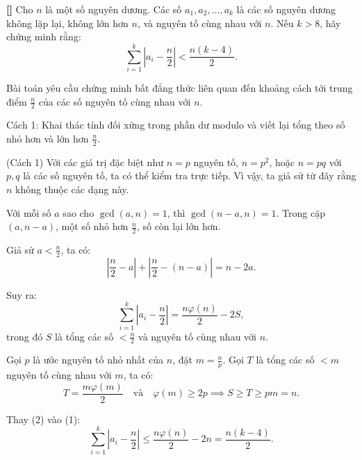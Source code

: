 \documentclass[../01-divisibility.tex]{subfiles}
\begin{document}
\begin{example*}\label{example:KOR-2015-MO-P8}\textbf{[]}
	Cho \( n \) là một số nguyên dương. Các số \( a_1, a_2, \dots, a_k \) là các số nguyên dương không lặp lại, không lớn hơn \( n \),
	và nguyên tố cùng nhau với \( n \). Nếu \( k > 8 \), hãy chứng minh rằng:
	\[
		\sum_{i=1}^k \left| a_i - \frac{n}{2} \right| < \frac{n(k - 4)}{2}.
	\]
\end{example*}

\begin{story*}
	Bài toán yêu cầu chứng minh bất đẳng thức liên quan đến khoảng cách tới trung điểm \( \frac{n}{2} \) của các số nguyên tố cùng nhau với \( n \).

	Cách 1: Khai thác tính đối xứng trong phần dư modulo và viết lại tổng theo số nhỏ hơn và lớn hơn \( \frac{n}{2} \).
\end{story*}

\begin{soln}(Cách 1)\footnotemark
	Với các giá trị đặc biệt như \( n = p \) nguyên tố, \( n = p^2 \), hoặc \( n = pq \) với \( p, q \) là các số nguyên tố, ta có thể kiểm tra trực tiếp.
	Vì vậy, ta giả sử từ đây rằng \( n \) không thuộc các dạng này.

	Với mỗi số \( a \) sao cho \( \gcd(a, n) = 1 \), thì \( \gcd(n - a, n) = 1 \). Trong cặp \( (a, n - a) \), một số nhỏ hơn \( \frac{n}{2} \), số còn lại lớn hơn.

	Giả sử \( a < \frac{n}{2} \), ta có:
	\[
		\left| \frac{n}{2} - a \right| + \left| \frac{n}{2} - (n - a) \right| = n - 2a.
	\]

	Suy ra:
	\[
		\sum_{i=1}^k \left| a_i - \frac{n}{2} \right| = \frac{n\varphi(n)}{2} - 2S, \tag{1}
	\]
	trong đó \( S \) là tổng các số \( < \frac{n}{2} \) và nguyên tố cùng nhau với \( n \).

	Gọi \( p \) là ước nguyên tố nhỏ nhất của \( n \), đặt \( m = \frac{n}{p} \). Gọi \( T \) là tổng các số \( < m \) nguyên tố cùng nhau với \( m \), ta có:
	\[
		T = \frac{m\varphi(m)}{2} \quad \text{và} \quad \varphi(m) \ge 2p \implies S \ge T \ge pm = n. \tag{2}
	\]

	Thay (2) vào (1):
	\[
		\sum_{i=1}^k \left| a_i - \frac{n}{2} \right| \le \frac{n\varphi(n)}{2} - 2n = \frac{n(k - 4)}{2}.
	\]
\end{soln}

\end{document}
